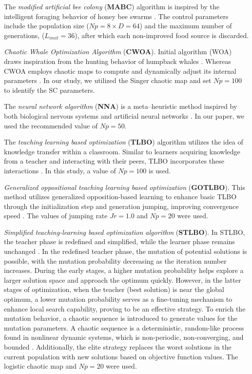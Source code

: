 \documentclass[a4paper,fleqn]{cas-sc}
\begin{document}
The \emph{modified artificial bee colony} (\textbf{MABC}) algorithm is inspired
by the intelligent foraging behavior of honey bee swarms \cite{MABC}.
The control parameters include the population size ($N\!p=8\times D=64$)
and the maximum number of generations, ($L_{imit}=36$), after which each non-improved food source is discarded.


\emph{Chaotic Whale Optimization Algorithm} (\textbf{CWOA}).
Initial algorithm (WOA) draws inspiration from the hunting behavior of humpback whales \cite{WOA}.
Whereas CWOA employs chaotic maps to compute and dynamically adjust its internal parameters \cite{CWOA}.
In our study, we utilized the Singer chaotic map and set $N\!p=100$ to identify the SC parameters.

The \emph{neural network algorithm} (\textbf{NNA}) is a meta--heuristic method
inspired by both biological nervous systems and artificial neural networks \cite{NNA}.
In our paper, we used the recommended \cite{NNA} value of $N\!p=50$.

The \emph{teaching learning based optimization} (\textbf{TLBO}) algorithm utilizes the idea of knowledge transfer within a classroom.
Similar to learners acquiring knowledge from a teacher and interacting with their peers,
TLBO incorporates these interactions \cite{TLBO_Patel}.
In this study, a value of $N\!p=100$ is used.

\emph{Generalized oppositional teaching learning based optimization} (\textbf{GOTLBO}).
This method utilizes generalized opposition-based learning to enhance basic TLBO
through the initialization step and generation jumping, improving convergence speed \cite{GOTLBO}.
The values of jumping rate $J\!r=1.0$ and $N\!p=20$ were used.

\emph{Simplified teaching-learning based optimization algorithm} (\textbf{STLBO}).
In STLBO, the teacher phase is redefined and simplified, while the learner phase remains unchanged \cite{STLBO}.
In the redefined teacher phase, the mutation of potential solutions is possible,
with the mutation probability decreasing as the iteration number increases.
During the early stages, a higher mutation probability helps explore a larger solution space
and approach the optimum quickly.
However, in the latter stages of optimization, when the teacher (best solution) is near the global optimum,
a lower mutation probability serves as a fine-tuning mechanism
to enhance local search capability, proving to be an effective strategy.
To enrich the mutation behavior, a chaotic sequence is introduced to generate values for the mutation parameters.
A chaotic sequence is a deterministic, random-like process found in nonlinear dynamic systems,
which is non-periodic, non-converging, and bounded \cite{May1976}.
Additionally, the elite strategy replaces the worst solutions in the current population with new solutions based on objective function values.
The logistic chaotic map and $N\!p=20$ were used.
\end{document}
